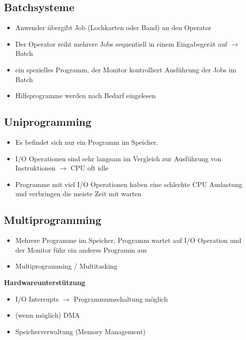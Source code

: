 \documentclass{report}
\theoremstyle{definition}
\theoremstyle{example}
\begin{document}
	\subsection{Batchsysteme}
		\begin{itemize}
			\item Anwender übergibt Job (Lochkarten oder Band) an den Operator
			\item Der Operator reiht mehrere Jobs sequentiell in einem Eingabegerät auf $\rightarrow$ Batch
			\item ein spezielles Programm, der Monitor kontrolliert Ausführung der Jobs im Batch
			\item Hilfsprogramme werden nach Bedarf eingelesen
		\end{itemize}
		
	\subsection{Uniprogramming}
		\begin{itemize}
			\item Es befindet sich nur ein Programm im Speicher.
			\item I/O Operationen sind sehr langsam im Vergleich zur Ausführung von Instruktionen $\rightarrow$ CPU oft idle
			\item Programme mit viel I/O Operationen haben eine schlechte CPU Auslastung und verbringen die meiste Zeit mit warten		
		\end{itemize}

	\subsection{Multiprogramming}
		\begin{itemize}
			\item Mehrere Programme im Speicher, Programm wartet auf I/O Operation und der Monitor führ ein anderes Programm aus
			\item Multiprogramming / Multitasking
		\end{itemize}
		
		\textbf{Hardwareunterstützung}\\
		\begin{itemize}
			\item I/O Interrupts $\rightarrow$ Programmumschaltung möglich
			\item (wenn möglich) DMA
			\item Speicherverwaltung (Memory Management)
		\end{itemize}
		
\end{document}
